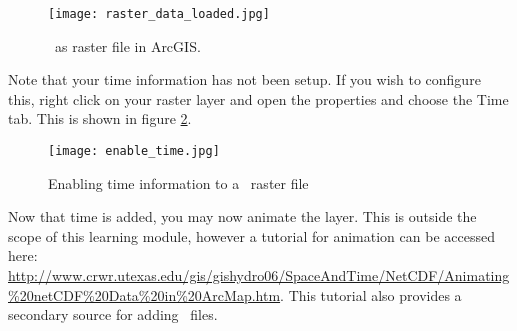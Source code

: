 \begin{figure}
	\centering
	\texttt{[image: raster\_data\_loaded.jpg]}
	\caption{\ioapi~as raster file in ArcGIS.}
	\label{raster_loaded}
\end{figure}

Note that your time information has not been setup.  If you wish to
configure this, right click on your raster layer and open the
properties and choose the Time tab.  This is shown in figure
\ref{enable_time}.

\begin{figure}
	\centering
	\texttt{[image: enable\_time.jpg]}
	\caption{Enabling time information to a \netcdf~raster file}
	\label{enable_time}
\end{figure}

Now that time is added, you may now animate the layer.  This is
outside the scope of this learning module, however a tutorial for
animation can be accessed here:
\url{http://www.crwr.utexas.edu/gis/gishydro06/SpaceAndTime/NetCDF/Animating\%20netCDF\%20Data\%20in\%20ArcMap.htm}.
This tutorial also provides a secondary source for adding
\netcdf~files.
